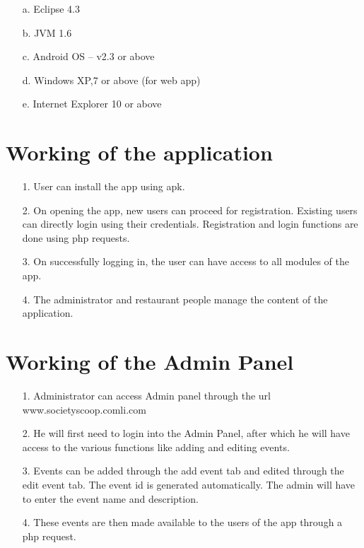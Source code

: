 \begin{itemize}
\begin{itemize}
\item[a.] Eclipse 4.3

\item[b.] JVM 1.6

\item[c.] Android OS – v2.3 or above

\item[d.] Windows XP,7 or above (for web app)

\item[e.] Internet Explorer 10 or above

\end{itemize}

\end{itemize}

\section{Working of the application}
\begin{itemize}
\item[1.]User can install the app using apk.
\item[2.]On opening the app, new users can proceed for registration. Existing users can directly login using their credentials. Registration and login functions are done using php requests.
\item[3.]On successfully logging in, the user can have access to all modules of the app.
\item[4.]The administrator and restaurant people manage the content of the application.
\end{itemize}


\section{Working of the Admin Panel}
\begin{itemize}
\item[1.]Administrator can access Admin panel through the url www.societyscoop.comli.com
\item[2.]He will first need to login into the Admin Panel, after which he will have access to the various functions like adding and editing events.
\item[3.]Events can be added through the add event tab and edited through the edit event tab. The event id is generated automatically. The admin will have to enter the event name and description.
\item[4.]These events are then made available to the users of the app through a php request.
\end{itemize}


